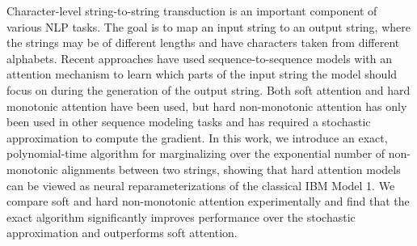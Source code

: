 Character-level string-to-string transduction is an important component of various NLP tasks. The goal is to map an input string to an output string, where the strings may be of different lengths and have characters taken from different alphabets. Recent approaches have used sequence-to-sequence models with an attention mechanism to learn which parts of the input string the model should focus on during the generation of the output string. Both soft attention and hard monotonic attention have been used, but hard non-monotonic attention has only been used in other sequence modeling tasks and has required a stochastic approximation to compute the gradient. In this work, we introduce an exact, polynomial-time algorithm for marginalizing over the exponential number of non-monotonic alignments between two strings, showing that hard attention models can be viewed as neural reparameterizations of the classical IBM Model 1. We compare soft and hard non-monotonic attention experimentally and find that the exact algorithm significantly improves performance over the stochastic approximation and outperforms soft attention.
